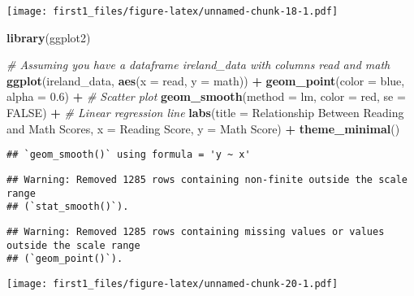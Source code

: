 \documentclass[
]{article}
\newenvironment{Shaded}{\begin{snugshade}}{\end{snugshade}}
\newcommand{\AttributeTok}[1]{\textcolor[rgb]{0.13,0.29,0.53}{#1}}
\newcommand{\CommentTok}[1]{\textcolor[rgb]{0.56,0.35,0.01}{\textit{#1}}}
\newcommand{\ConstantTok}[1]{\textcolor[rgb]{0.56,0.35,0.01}{#1}}
\newcommand{\FloatTok}[1]{\textcolor[rgb]{0.00,0.00,0.81}{#1}}
\newcommand{\FunctionTok}[1]{\textcolor[rgb]{0.13,0.29,0.53}{\textbf{#1}}}
\newcommand{\NormalTok}[1]{#1}
\newcommand{\SpecialCharTok}[1]{\textcolor[rgb]{0.81,0.36,0.00}{\textbf{#1}}}
\newcommand{\StringTok}[1]{\textcolor[rgb]{0.31,0.60,0.02}{#1}}
\begin{document}
\texttt{[image: first1\_files/figure-latex/unnamed-chunk-18-1.pdf]}

\begin{Shaded}
\begin{Highlighting}[]
\FunctionTok{library}\NormalTok{(ggplot2)}

\CommentTok{\# Assuming you have a dataframe \textquotesingle{}ireland\_data\textquotesingle{} with columns \textquotesingle{}read\textquotesingle{} and \textquotesingle{}math\textquotesingle{}}
\FunctionTok{ggplot}\NormalTok{(ireland\_data, }\FunctionTok{aes}\NormalTok{(}\AttributeTok{x =}\NormalTok{ read, }\AttributeTok{y =}\NormalTok{ math)) }\SpecialCharTok{+}
  \FunctionTok{geom\_point}\NormalTok{(}\AttributeTok{color =} \StringTok{\textquotesingle{}blue\textquotesingle{}}\NormalTok{, }\AttributeTok{alpha =} \FloatTok{0.6}\NormalTok{) }\SpecialCharTok{+} \CommentTok{\# Scatter plot}
  \FunctionTok{geom\_smooth}\NormalTok{(}\AttributeTok{method =} \StringTok{\textquotesingle{}lm\textquotesingle{}}\NormalTok{, }\AttributeTok{color =} \StringTok{\textquotesingle{}red\textquotesingle{}}\NormalTok{, }\AttributeTok{se =} \ConstantTok{FALSE}\NormalTok{) }\SpecialCharTok{+} \CommentTok{\# Linear regression line}
  \FunctionTok{labs}\NormalTok{(}\AttributeTok{title =} \StringTok{\textquotesingle{}Relationship Between Reading and Math Scores\textquotesingle{}}\NormalTok{,}
       \AttributeTok{x =} \StringTok{\textquotesingle{}Reading Score\textquotesingle{}}\NormalTok{,}
       \AttributeTok{y =} \StringTok{\textquotesingle{}Math Score\textquotesingle{}}\NormalTok{) }\SpecialCharTok{+}
  \FunctionTok{theme\_minimal}\NormalTok{()}
\end{Highlighting}
\end{Shaded}

\begin{verbatim}
## `geom_smooth()` using formula = 'y ~ x'
\end{verbatim}

\begin{verbatim}
## Warning: Removed 1285 rows containing non-finite outside the scale range
## (`stat_smooth()`).
\end{verbatim}

\begin{verbatim}
## Warning: Removed 1285 rows containing missing values or values outside the scale range
## (`geom_point()`).
\end{verbatim}

\texttt{[image: first1\_files/figure-latex/unnamed-chunk-20-1.pdf]}
\end{document}
